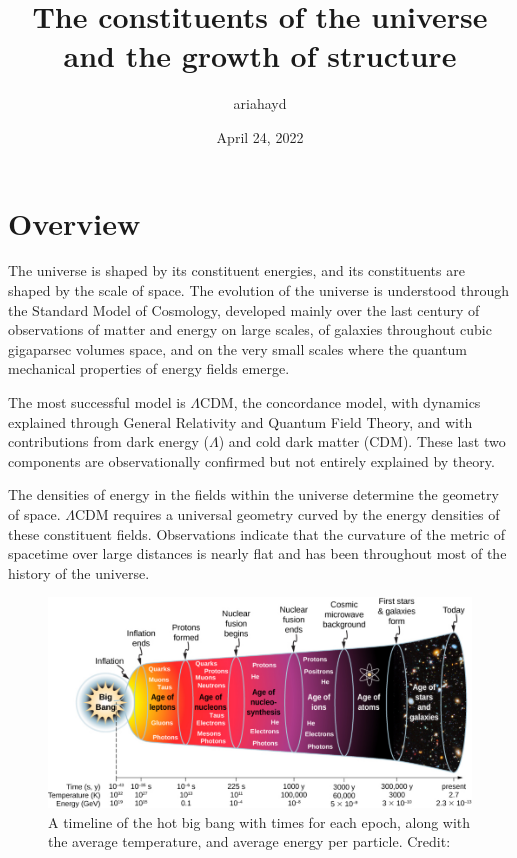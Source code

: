 \documentclass{paper}
\begin{document}
 

\title{The constituents of the universe and the growth of structure}
\author{ariahayd}
\date{April 24, 2022}
\maketitle

\section{Overview}
  The universe is shaped by its constituent energies, and its constituents are
  shaped by the scale of space. The evolution of the universe is understood 
  through the Standard Model of Cosmology, developed mainly over the last 
  century of observations of matter and energy on large scales, of galaxies 
  throughout cubic gigaparsec volumes space, and on the very small scales 
  where the quantum mechanical properties of energy fields emerge. 

  The most successful model is $\Lambda$CDM, the concordance model, with 
  dynamics explained through General Relativity and Quantum Field Theory, and 
  with contributions from dark energy ($\Lambda$) and cold dark matter 
  (CDM). These last two components are observationally confirmed but not 
  entirely explained by theory. 

  The densities of energy in the fields within the universe determine the 
  geometry of space. $\Lambda$CDM requires a universal geometry curved by 
  the energy densities of these constituent fields. Observations indicate that 
  the curvature of the metric of spacetime over large distances is nearly 
  flat and has been throughout most of the history of the universe.
  
  \begin{figure}[H]
    \begin{centering}
    \includegraphics[scale=0.8]{Intro-big_bang.pdf}
    \caption{A timeline of the hot big bang with times for each epoch,
      along with the average temperature, and average energy per particle.
    Credit: \cite{2016Ling}}
    \label{fig:Intro-big_bang}
    \end{centering}
  \end{figure}
\end{document}

